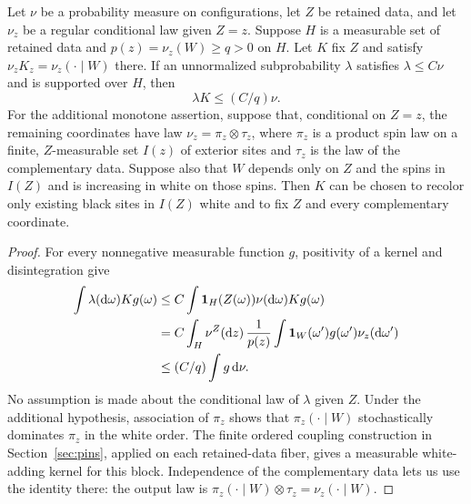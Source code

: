 \begin{lemma}\label{lemma:dominated-kernel}
Let $\nu$ be a probability measure on configurations, let $Z$ be
retained data, and let $\nu_z$ be a regular conditional law given $Z=z$.
Suppose $H$ is a measurable set of retained data and
$p(z)=\nu_z(W)\ge q>0$ on $H$.  Let $K$ fix $Z$ and satisfy
$\nu_zK_z=\nu_z(\cdot\mid W)$ there.  If an unnormalized
subprobability $\lambda$ satisfies $\lambda\le C\nu$ and is supported
over $H$, then
\[
                         \lambda K\le (C/q)\nu.
\]
For the additional monotone assertion, suppose that, conditional on
$Z=z$, the remaining coordinates have law
$\nu_z=\pi_z\otimes\tau_z$, where $\pi_z$ is a product spin law on
a finite, $Z$-measurable set $I(z)$ of exterior sites and $\tau_z$
is the law of the complementary data. Suppose also that $W$ depends
only on $Z$ and the spins in $I(Z)$ and is increasing in white on
those spins. Then $K$ can be chosen to recolor only existing black
sites in $I(Z)$ white and to fix $Z$ and every complementary coordinate.
\end{lemma}

\begin{proof}
For every nonnegative measurable function $g$, positivity of a kernel
and disintegration give
\begin{align*}
 \int\lambda(\mathrm d\omega)Kg(\omega)
 &\le C\int\mathbf 1_H(Z(\omega))\nu(\mathrm d\omega)Kg(\omega)\\
 &=C\int_H\nu^Z(\mathrm d z)\,
       \frac{1}{p(z)}\int\mathbf 1_W(\omega')g(\omega')
                                      \nu_z(\mathrm d\omega')\\
 &\le(C/q)\int g\,\mathrm d\nu.
\end{align*}
No assumption is made about the conditional law of $\lambda$ given
$Z$. Under the additional hypothesis, association of $\pi_z$ shows
that $\pi_z(\cdot\mid W)$ stochastically dominates $\pi_z$ in the
white order. The finite ordered coupling construction in
Section~\ref{sec:pins}, applied on each retained-data fiber, gives
a measurable white-adding kernel for this block. Independence of
the complementary data lets us use the identity there: the output
law is $\pi_z(\cdot\mid W)\otimes\tau_z=\nu_z(\cdot\mid W)$.
\end{proof}

